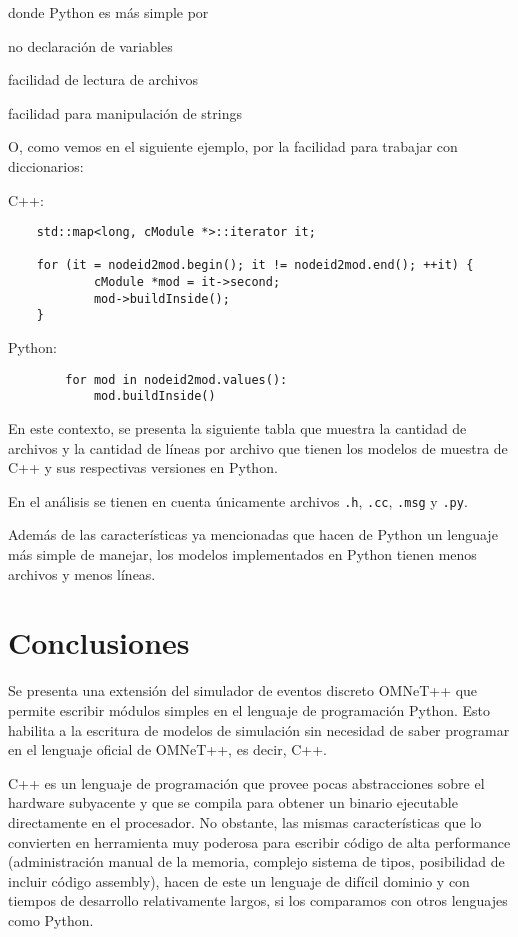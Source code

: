 \documentclass[]{article}
\begin{document}
donde Python es más simple por

no declaración de variables

facilidad de lectura de archivos

facilidad para manipulación de strings

O, como vemos en el siguiente ejemplo, por la facilidad para trabajar con
diccionarios:


C++:

\begin{verbatim}
    std::map<long, cModule *>::iterator it;

    for (it = nodeid2mod.begin(); it != nodeid2mod.end(); ++it) {
            cModule *mod = it->second;
            mod->buildInside();
    }
\end{verbatim}

Python:

\begin{verbatim}
        for mod in nodeid2mod.values():
            mod.buildInside()
\end{verbatim}

En este contexto, se presenta la siguiente tabla que muestra la cantidad de
archivos y la cantidad de líneas por archivo que tienen los modelos de muestra
de C++ y sus respectivas versiones en Python.

En el análisis se tienen en cuenta únicamente archivos \verb!.h!, \verb!.cc!,
\verb!.msg! y \verb!.py!.


Además de las características ya mencionadas que hacen de Python un lenguaje
más simple de manejar, los modelos implementados en Python tienen menos
archivos y menos líneas.

\section{Conclusiones}
Se presenta una extensión del simulador de eventos discreto OMNeT++ que permite
escribir módulos simples en el lenguaje de programación Python. Esto habilita a
la escritura de modelos de simulación sin necesidad de saber programar en el
lenguaje oficial de OMNeT++, es decir, C++.

C++ es un lenguaje de programación que provee pocas abstracciones sobre el
hardware subyacente y que se compila para obtener un binario ejecutable
directamente en el procesador. No obstante, las mismas características que lo
convierten en herramienta muy poderosa para escribir código de alta performance
(administración manual de la memoria, complejo sistema de tipos, posibilidad de
incluir código assembly), hacen de este un lenguaje de difícil dominio y con
tiempos de desarrollo relativamente largos, si los comparamos con otros
lenguajes como Python.
\end{document}
